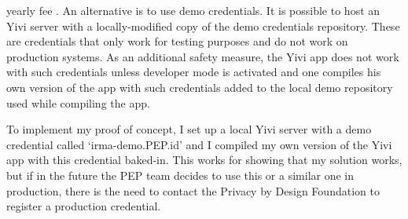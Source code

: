 \documentclass{report}
\begin{document}
yearly fee \cite{irma-docs-issuer}. An alternative is to use demo credentials. It is possible to host an Yivi server with a locally-modified copy of the demo credentials
repository. These are credentials that only work for testing purposes and do not work on production systems. As an additional safety measure, the Yivi app does not work with such
credentials unless developer mode is activated and one compiles his own version of the app with such credentials added to the local demo repository used while compiling the app. \par 
To implement my proof of concept, I set up a local Yivi server with a demo credential called \enquote*{irma-demo.PEP.id} and I compiled my own version of the Yivi app with
this credential baked-in. This works for showing that my solution works, but if in the future the PEP team decides to use this or a similar one in production, there is the need to
contact the Privacy by Design Foundation to register a production credential.
\end{document}
